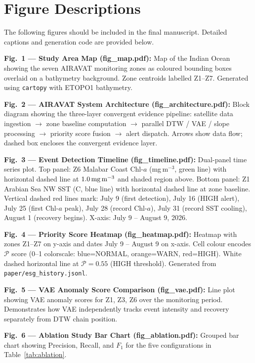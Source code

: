 \documentclass[journal]{IEEEtran}
\begin{document}
\appendix
\section{Figure Descriptions}
\label{app:figures}

The following figures should be included in the final manuscript.
Detailed captions and generation code are provided below.

\textbf{Fig.~1 — Study Area Map (fig\_map.pdf):}
Map of the Indian Ocean showing the seven AIRAVAT monitoring zones
as coloured bounding boxes overlaid on a bathymetry background.
Zone centroids labelled Z1--Z7. Generated using
\texttt{cartopy} with ETOPO1 bathymetry.

\textbf{Fig.~2 — AIRAVAT System Architecture (fig\_architecture.pdf):}
Block diagram showing the three-layer convergent evidence pipeline:
satellite data ingestion $\to$ zone baseline computation $\to$
parallel DTW / VAE / slope processing $\to$ priority score fusion
$\to$ alert dispatch. Arrows show data flow; dashed box encloses
the convergent evidence layer.

\textbf{Fig.~3 — Event Detection Timeline (fig\_timeline.pdf):}
Dual-panel time series plot. Top panel: Z6 Malabar Coast Chl-$a$
(mg\,m$^{-3}$, green line) with horizontal dashed line at
$1.0\,\text{mg\,m}^{-3}$ and shaded region above. Bottom panel:
Z1 Arabian Sea NW SST (\textdegree C, blue line) with horizontal
dashed line at zone baseline. Vertical dashed red lines mark:
July 9 (first detection), July 16 (HIGH alert), July 25 (first
Chl-$a$ peak), July 28 (record Chl-$a$), July 31 (record SST cooling),
August 1 (recovery begins). X-axis: July 9 -- August 9, 2026.

\textbf{Fig.~4 — Priority Score Heatmap (fig\_heatmap.pdf):}
Heatmap with zones Z1--Z7 on y-axis and dates July 9 -- August 9
on x-axis. Cell colour encodes $\mathcal{P}$ score (0--1 colorscale:
blue=NORMAL, orange=WARN, red=HIGH). White dashed horizontal line
at $\mathcal{P}=0.55$ (HIGH threshold). Generated from
\texttt{paper/esg\_history.jsonl}.

\textbf{Fig.~5 — VAE Anomaly Score Comparison (fig\_vae.pdf):}
Line plot showing VAE anomaly scores for Z1, Z3, Z6 over the
monitoring period. Demonstrates how VAE independently tracks
event intensity and recovery separately from DTW chain position.

\textbf{Fig.~6 — Ablation Study Bar Chart (fig\_ablation.pdf):}
Grouped bar chart showing Precision, Recall, and $F_1$ for
the five configurations in Table~\ref{tab:ablation}.
\end{document}

